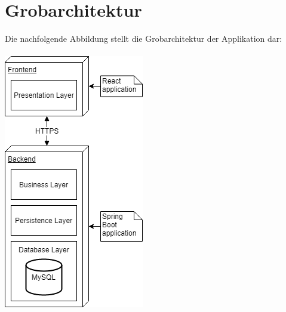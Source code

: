 \chapter{Grobarchitektur}
\vspace{0.5cm}

Die nachfolgende Abbildung stellt die Grobarchitektur der Applikation dar:\\ \\
\includegraphics[scale=1]{images/grobarchitektur.png} 